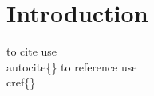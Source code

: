 \chapter{Introduction}
\label{chap:introduction}


to cite use \\autocite\{\} to reference use \\cref\{\}